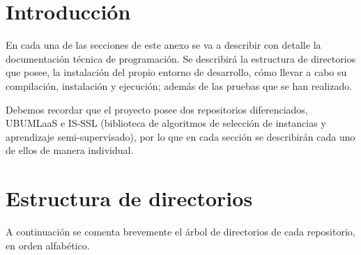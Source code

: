 
\section{Introducción}
En cada una de las secciones de este anexo se va a describir con detalle la documentación técnica de programación. Se describirá la estructura de directorios que posee, la instalación del propio entorno de desarrollo, cómo llevar a cabo su compilación, instalación y ejecución; además de las pruebas que se han realizado.

Debemos recordar que el proyecto posee dos repositorios diferenciados, UBUMLaaS e IS-SSL (biblioteca de algoritmos de selección de instancias y aprendizaje semi-supervisado), por lo que en cada sección se describirán cada uno de ellos de manera individual.

\section{Estructura de directorios}
A continuación se comenta brevemente el árbol de directorios de cada repositorio, en orden alfabético.
